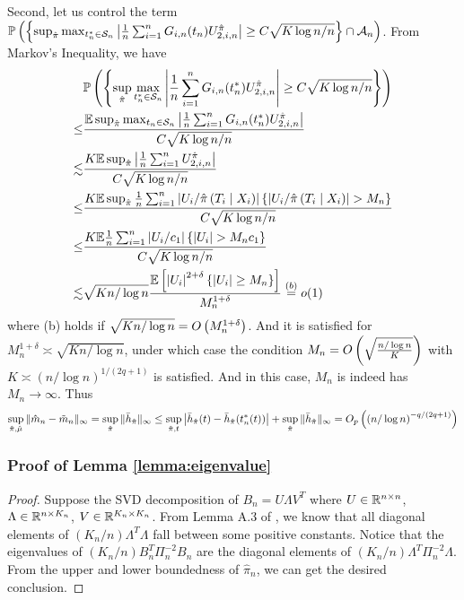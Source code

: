 Second, let us control the term $\mathbb{P}\left(\left\{ \sup_{\hat{\pi}}\max_{t_{n}^*\in\mathcal{S}_{n}}\left|\frac{1}{n}\sum_{i=1}^{n}G_{i,n}(t_{n})U_{2,i,n}^{\hat{\pi}}\right|\geq C\sqrt{K\log n/n}\right\} \cap\mathcal{A}_{n}\right)$.
From Markov's Inequality, we have
\begin{align*}
 & \P\left(\left\{ \sup_{\hat{\pi}}\max_{t_{n}^*\in\Sn}\left|\frac{1}{n}\sum_{i=1}^{n}G_{i,n}(t_{n}^*)U_{2,i,n}^{\hat{\pi}}\right|\geq C\sqrt{K\log n/n}\right\} \right)\\
\leq & \frac{\E\sup_{\hat{\pi}}\max_{t_{n}\in\Sn}\left|\frac{1}{n}\sum_{i=1}^{n}G_{i,n}(t_{n}^*)U_{2,i,n}^{\hat{\pi}}\right|}{C\sqrt{K\log n/n}}\\
\lesssim & \frac{K\E\sup_{\hat{\pi}}\left|\frac{1}{n}\sum_{i=1}^{n}U_{2,i,n}^{\hat{\pi}}\right|}{C\sqrt{K\log n/n}}\\
\leq & \frac{K\E\sup_{\hat{\pi}}\frac{1}{n}\sum_{i=1}^{n}\left|U_{i}/\hat{\pi}\left(T_{i}\mid X_{i}\right)\right|\left\{ \left|U_{i}/\hat{\pi}\left(T_{i}\mid X_{i}\right)\right|>M_{n}\right\} }{C\sqrt{K\log n/n}}\\
\leq & \frac{K\E\frac{1}{n}\sum_{i=1}^{n}\left|U_{i}/c_{1}\right|\left\{ \left|U_{i}\right|>M_{n}c_{1}\right\} }{C\sqrt{K\log n/n}}\\
\lesssim & \sqrt{Kn/\log n}\frac{\E\left[\left|U_{i}\right|^{2+\delta}\left\{ \left|U_{i}\right|\geq M_{n}\right\} \right]}{M_{n}^{1+\delta}}\stackrel{(b)}{=}o(1)
\end{align*}
where (b) holds if $\sqrt{Kn/\log n}=O\left(M_{n}^{1+\delta}\right)$.
And it is satisfied for $M_{n}^{1+\delta}\asymp\sqrt{Kn/\log n}$,
under which case the condition $M_{n}=O\left(\sqrt{\frac{n/\log n}{K}}\right)$
with $K\asymp\left(n/\log n\right)^{1/(2q+1)}$ is satisfied. And
in this case, $M_{n}$ is indeed has $M_{n}\rightarrow\infty$. Thus
$$
\sup_{\hat{\pi},\hat\mu}\|\hat{m}_n-\tilde{m}_n\|_{\infty}
=\sup_{\hat{\pi}}\|\bar{h}_{\hat{\pi}}\|_{\infty}
\leq 
\sup_{\hat{\pi},t}\left|\bar{h}_{\hat{\pi}}(t)-\bar{h}_{\hat{\pi}}(t_{n}^*(t))\right|
+
\sup_{\hat{\pi}}\|\bar{h}_{\hat{\pi}}\|_{\infty}
=O_p\left(\left(n/\log n\right)^{-q/(2q+1)}\right)
$$
\fi 


\subsubsection{Proof of Lemma \ref{lemma:eigenvalue}}
\begin{proof}
Suppose the SVD decomposition of $B_n=U\Lambda V^T$ where $U\in\mathbb{R}^{n\times n}$, $\Lambda\in\mathbb{R}^{n\times K_n}$, $V\in\mathbb{R}^{K_n\times K_n}$. From Lemma A.3 of \cite{huang2004polynomial}, we know that all diagonal elements of $\left(K_n/n\right)\Lambda^T\Lambda$ fall between some positive constants. Notice that the eigenvalues of $\left(K_n/n\right)B_n^T\Pi_n^{-2}B_n$ are the diagonal elements of $\left(K_n/n\right)\Lambda^T\Pi_n^{-2}\Lambda$. From the upper and lower boundedness of $\hat\pi_n$, we can get the desired conclusion. 
\end{proof}



